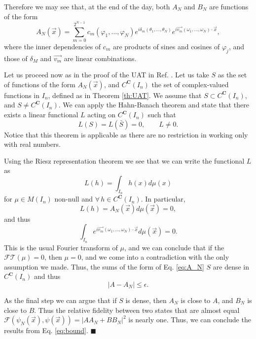 \documentclass[aps,amssymb,amsmath,amsfonts,pra,superscriptaddress,onecolumn]{revtex4}
\begin{document}
Therefore we may see that, at the end of the day, both $A_N$ and $B_N$ are functions of the form
\begin{equation}\label{eq:A_N}
A_N(\vec x) = \sum_{m = 0}^{2^{N - 1}} c_m(\varphi_1, \ldots, \varphi_N) e^{i \delta_m(\theta_1, \ldots, \theta_N)} e^{i \vec{v_m}(\omega_1, \ldots, \omega_N) \cdot \vec x}, 
\end{equation}
where the inner dependencies of $c_m$ are products of sines and cosines of $\varphi_j$, and those of $\delta_M$ and $\vec{v_m}$ are linear combinations. 

Let us proceed now as in the proof of the UAT in Ref. \cite{uat-cybenko1989}. Let us take $S$ as the set of functions of the form $A_N(\vec x)$, and $C^{\mathbf{C}}(I_n)$ the set of complex-valued functions in $I_n$, defined as in Theorem \ref{th:UAT}. We assume that $S \subset C^{\mathbf{C}}(I_n)$, and $S \neq C^{\mathbf{C}}(I_n)$. We can apply the Hahn-Banach theorem and state that there exists a linear functional $L$ acting on $C^{\mathbf{C}}(I_n)$ such that
\begin{equation}
L(S) = L(\bar{S}) = 0, \qquad L\neq 0.
\end{equation}
Notice that this theorem is applicable as there are no restriction in working only with real numbers. 

Using the Riesz representation theorem we see that we can write the functional $L$ as 
\begin{equation}
L(h) = \int_{I_n} h(x) d\mu(x)
\end{equation}
for $\mu \in M(I_n)$ non-null and $\forall \, h \in  C^{\mathbf{C}}(I_n)$. In particular, 
\begin{equation}
L(h) = A_N(\vec x) d\mu(\vec x) = 0,
\end{equation}
and thus
\begin{equation}
\int_{I_n} e^{i\vec{v_m}(\omega_1, \ldots, \omega_N) \cdot \vec x} d\mu(\vec x) = 0.
\end{equation}
This is the usual Fourier transform of $\mu$, and we can conclude that if the $\mathcal{FT}(\mu) = 0$, then $\mu = 0$, and we come into a contradiction with the only assumption we made. Thus, the sums of the form of Eq. \eqref{eq:A_N} $S$ are dense in $C^{\mathbf{C}}(I_n)$ and thus 
\begin{equation}
|A - A_N| \leq \epsilon.
\end{equation}

As the final step we can argue that if $S$ is dense, then $A_N$ is close to $A$, and $B_N$ is close to $B$. Thus the relative fidelity between two states that are almost equal $ \mathcal{F}(\psi_N(\vec x), \psi(\vec x)) = |A A_N + B B_N|^2 $ is nearly one. Thus, we can conclude the results from Eq. \ref{eq:bound}.
$\blacksquare$
\end{document}

